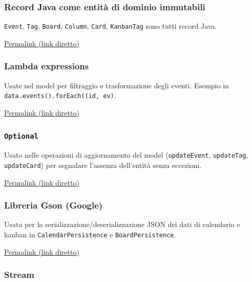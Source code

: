 \documentclass[a4paper,12pt]{report}
\begin{document}
\subsubsection{Record Java come entità di dominio immutabili}

\texttt{Event}, \texttt{Tag}, \texttt{Board}, \texttt{Column}, \texttt{Card}, \texttt{KanbanTag} sono tutti record Java.

\href{https://github.com/EnricoP0421/PSS25-Chronio/blob/34d1db0db9fd6cff156d6554a28cfc19982bf427/src/main/java/com/chronio/calendar/model/Event.java#L9-L16}{Permalink (link diretto)}

\subsubsection{Lambda expressions}

Usate nel model per filtraggio e trasformazione degli eventi. Esempio in \texttt{data.events().forEach((id, ev)}.
      
\href{https://github.com/EnricoP0421/PSS25-Chronio/blob/34d1db0db9fd6cff156d6554a28cfc19982bf427/src/main/java/com/chronio/calendar/model/CalendarModelImpl.java#L129-L136}{Permalink (link diretto)}

\subsubsection{\texttt{Optional}}

Usato nelle operazioni di aggiornamento del model (\texttt{updateEvent}, \texttt{updateTag}, \texttt{updateCard}) per segnalare l'assenza dell'entità senza eccezioni.

\href{https://github.com/EnricoP0421/PSS25-Chronio/blob/34d1db0db9fd6cff156d6554a28cfc19982bf427/src/main/java/com/chronio/calendar/model/CalendarModelImpl.java#L51-L54}{Permalink (link diretto)}
\subsubsection{Libreria Gson (Google)}

Usata per la serializzazione/deserializzazione JSON dei dati di calendario e kanban in \texttt{CalendarPersistence} e \texttt{BoardPersistence}.

\href{https://github.com/EnricoP0421/PSS25-Chronio/blob/34d1db0db9fd6cff156d6554a28cfc19982bf427/src/main/java/com/chronio/calendar/persistence/CalendarPersistence.java#L55-L67}{Permalink (link diretto)}

\subsubsection{Stream}
\end{document}
